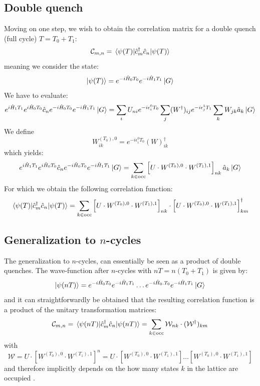 \documentclass[11pt, a4paper, oneside]{book}
\theoremstyle{definition} %
\begin{document}
	\subsection{Double quench}
	Moving on one step, we wish to obtain the correlation matrix for a double quench (full cycle) $T = T_0 + T_1$:
\begin{equation}
	\mathcal{C}_{m,n} = \mel{\psi(T)}{\hat{c}_m^\dagger \hat{c}_n}{\psi(T)}
\end{equation}
meaning we consider the state:
	\begin{equation}
		\ket{\psi(T)} = e^{-i \hat{H}_0 T_0} e^{-i \hat{H}_1 T_1} \ket{G}
	\end{equation}
	We have to evaluate:
	\begin{equation}
		e^{i\hat{H}_1 T_1}e^{i \hat{H}_0 T_0} \hat{c}_n e^{-i \hat{H}_0 T_0} e^{-i \hat{H}_1 T_1}\ket{G} = \sum_i U_{ni} e^{-i \epsilon_i^0 T_0} \sum_j (W^\dagger)_{ij} e^{-i\epsilon_j^1 T_1}\sum_k W_{jk} \hat{a}_k \ket{G}
	\end{equation}
	We define
	\begin{equation}
		W_{ik}^{(T_0),0} = e^{-i \epsilon_{i}^0 T_0}(W)^\dagger_{ik}
	\end{equation}
	which yields:
	\begin{equation}
		e^{i\hat{H}_1 T_1}e^{i \hat{H}_0 T_0} \hat{c}_n e^{-i \hat{H}_0 T_0} e^{-i \hat{H}_1 T_1}\ket{G} = \sum_{k \in \text{occ}} \left[ U \cdot W^{(T_0),0} \cdot W^{(T_1),1}\right]_{nk} \hat{a}_k \ket{G}
	\end{equation}
	For which we obtain the following correlation function:
	\begin{equation}
		\mel{\psi(T)}{\hat{c}_m^\dagger \hat{c}_n}{\psi(T)} = \sum_{k \in \text{occ}} \left[ U\cdot W^{(T_0),0} \cdot W^{(T_1),1}\right]_{nk} \cdot \left[ U \cdot W^{(T_0),0} \cdot W^{(T_1),1}\right]^\dagger_{km}
	\end{equation}
	\subsection{Generalization to $n$-cycles}
	The generalization to $n$-cycles, can essentially be seen as a product of double quenches. The wave-function after $n$-cycles with $nT = n(T_0 + T_1)$ is given by:
	\begin{equation}
		\ket{\psi(nT)} = e^{-i \hat{H}_0 T_0} e^{-i \hat{H}_1 T_1} \dots e^{-i \hat{H}_0. T_0 } e^{-i \hat{H}_1 T_1} \ket{G}
	\end{equation}
	and it can straightforwardly be obtained that the resulting correlation function is a product of the unitary transformation matrices:
	\begin{equation}
		\mathcal{C}_{m,n} = \mel{\psi(nT)}{\hat{c}_m^\dagger \hat{c}_n }{\psi(nT)} = \sum_{k \in \text{occ}} \mathcal{W}_{nk}  \cdot (\mathcal{W}^\dagger)_{km}
		\label{eq:correlation_matrix_Xueda}
	\end{equation}
	with 
	\begin{equation}
		\mathcal{W} = U \cdot [W^{(T_0),0} \cdot W^{(T_1), 1}]^n = U \cdot [ W^{(T_0),0} \cdot W^{(T_1), 1}] \dots [ W^{(T_0), 0} \cdot W^{(T_1), 1}] 
	\end{equation}
	and therefore implicitly depends on the how many states $k$ in the lattice are occupied \cite{Xueda}.
\end{document}
